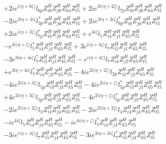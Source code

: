 \begin{align}
 &+2 i e^{i \Big(\eta +6 \zeta \Big)} l_{6p} Z_{{i 6}}^{H} Z_{{j 6}}^{H} Z_{{k 4}}^{H} Z_{{l 5}}^{H} +2 i e^{3 i \Big(\eta +2 \zeta \Big)} l_{7p} Z_{{i 6}}^{H} Z_{{j 6}}^{H} Z_{{k 4}}^{H} Z_{{l 5}}^{H} \nonumber \\ 
 &-2 i e^{3 i \eta +4 i \zeta } l_{3p}^* Z_{{i 6}}^{H} Z_{{j 6}}^{H} Z_{{k 4}}^{H} Z_{{l 5}}^{H} +2 i e^{3 i \eta +2 i \zeta } l_{6p}^* Z_{{i 6}}^{H} Z_{{j 6}}^{H} Z_{{k 4}}^{H} Z_{{l 5}}^{H} \nonumber \\ 
 &+2 i e^{i \Big(\eta +2 \zeta \Big)} l_{7p}^* Z_{{i 6}}^{H} Z_{{j 6}}^{H} Z_{{k 4}}^{H} Z_{{l 5}}^{H} +e^{4 i \zeta } l_5 Z_{{i 4}}^{H} Z_{{j 1}}^{H} Z_{{k 5}}^{H} Z_{{l 5}}^{H} \nonumber \\ 
 &- e^{4 i \Big(\eta +\zeta \Big)} l_5^* Z_{{i 4}}^{H} Z_{{j 1}}^{H} Z_{{k 5}}^{H} Z_{{l 5}}^{H} +3 e^{i \Big(\eta +4 \zeta \Big)} l_7 Z_{{i 5}}^{H} Z_{{j 1}}^{H} Z_{{k 5}}^{H} Z_{{l 5}}^{H} \nonumber \\ 
 &-3 e^{3 i \eta +4 i \zeta } l_7^* Z_{{i 5}}^{H} Z_{{j 1}}^{H} Z_{{k 5}}^{H} Z_{{l 5}}^{H} - e^{i \Big(\eta +4 \zeta \Big)} l_7 Z_{{i 4}}^{H} Z_{{j 2}}^{H} Z_{{k 5}}^{H} Z_{{l 5}}^{H} \nonumber \\ 
 &+e^{3 i \eta +4 i \zeta } l_7^* Z_{{i 4}}^{H} Z_{{j 2}}^{H} Z_{{k 5}}^{H} Z_{{l 5}}^{H} -4 i e^{2 i \Big(\eta +2 \zeta \Big)} l_{2p} Z_{{i 3}}^{H} Z_{{j 3}}^{H} Z_{{k 5}}^{H} Z_{{l 5}}^{H} \nonumber \\ 
 &-4 i e^{2 i \Big(\eta +3 \zeta \Big)} l_{5p} Z_{{i 3}}^{H} Z_{{j 3}}^{H} Z_{{k 5}}^{H} Z_{{l 5}}^{H} -4 i e^{2 i \Big(\eta +\zeta \Big)} l_{5p}^* Z_{{i 3}}^{H} Z_{{j 3}}^{H} Z_{{k 5}}^{H} Z_{{l 5}}^{H} \nonumber \\ 
 &+4 e^{2 i \Big(\eta +3 \zeta \Big)} l_{5p} Z_{{i 6}}^{H} Z_{{j 3}}^{H} Z_{{k 5}}^{H} Z_{{l 5}}^{H} -4 e^{2 i \Big(\eta +\zeta \Big)} l_{5p}^* Z_{{i 6}}^{H} Z_{{j 3}}^{H} Z_{{k 5}}^{H} Z_{{l 5}}^{H} \nonumber \\ 
 &-2 i e^{2 i \Big(\eta +2 \zeta \Big)} l_3 Z_{{i 4}}^{H} Z_{{j 4}}^{H} Z_{{k 5}}^{H} Z_{{l 5}}^{H} -2 i e^{2 i \Big(\eta +2 \zeta \Big)} l_4 Z_{{i 4}}^{H} Z_{{j 4}}^{H} Z_{{k 5}}^{H} Z_{{l 5}}^{H} \nonumber \\ 
 &-i e^{4 i \zeta } l_5 Z_{{i 4}}^{H} Z_{{j 4}}^{H} Z_{{k 5}}^{H} Z_{{l 5}}^{H} -i e^{4 i \Big(\eta +\zeta \Big)} l_5^* Z_{{i 4}}^{H} Z_{{j 4}}^{H} Z_{{k 5}}^{H} Z_{{l 5}}^{H} \nonumber \\ 
 &-3 i e^{i \Big(\eta +4 \zeta \Big)} l_7 Z_{{i 5}}^{H} Z_{{j 4}}^{H} Z_{{k 5}}^{H} Z_{{l 5}}^{H} -3 i e^{3 i \eta +4 i \zeta } l_7^* Z_{{i 5}}^{H} Z_{{j 4}}^{H} Z_{{k 5}}^{H} Z_{{l 5}}^{H} \nonumber \\ 

\end{align}
